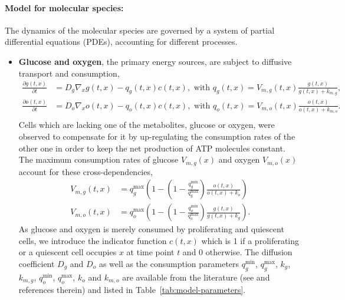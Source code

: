 \documentclass[10pt,letterpaper]{article}
\begin{document}
\paragraph{Model for molecular species:} 
The dynamics of the molecular species are governed by a system of partial differential equations (PDEs), accounting for different processes.
\begin{itemize}
%
\item \textbf{Glucose and oxygen}, the primary energy sources, are subject to diffusive transport and consumption,
\begin{equation*}
\begin{aligned}
	\frac{\partial g(t,x)}{\partial t} &= D_g \nabla_x g(t,x) - q_g(t,x) c(t,x), \text{ with } q_g(t,x) = V_{m,g}(t,x) \frac{g(t,x)}{g(t,x)+k_{m,g}},\\
	\frac{\partial o(t,x)}{\partial t} &= D_o \nabla_x o(t,x) - q_o(t,x) c(t,x), \text{ with } q_o(t,x) = V_{m,o}(t,x) \frac{o(t,x)}{o(t,x)+k_{m,o}}.\\
\end{aligned}
\end{equation*}
Cells which are lacking one of the metabolites, glucose or oxygen, were observed to compensate for it by up-regulating the consumption rates of the other one in order to keep the net production of ATP molecules constant. The maximum consumption rates of glucose $V_{m,g}(x)$ and oxygen $V_{m,o}(x)$ account for these cross-dependencies,
\begin{equation*}
\begin{aligned}
V_{m,g}(t,x) &= q_g^{\max} \left(1 - \left(1- \frac{q_g^{\min}}{q_g^{\max}} \right) \frac{o(t,x)}{o(t,x) + k_o} \right) \\
V_{m,o}(t,x) &= q_o^{\max} \left(1 - \left(1- \frac{q_o^{\min}}{q_o^{\max}} \right) \frac{g(t,x)}{g(t,x) + k_g} \right).
\end{aligned}
\end{equation*}
As glucose and oxygen is merely consumed by proliferating and quiescent cells, we introduce the indicator function $c(t,x)$ which is 1 if a proliferating or a quiescent cell occupies $x$ at time point $t$ and 0 otherwise. The diffusion coefficient $D_g$ and $D_o$ as well as the consumption parameters $q_g^{\min}$, $q_g^{\max}$, $k_g$, $k_{m,g}$, $q_o^{\min}$, $q_o^{\max}$, $k_o$ and $k_{m,o}$ are available from the literature (see \cite{Jagiella2012} and references therein) and listed in Table~\ref{tab:model-parameters}.


\end{itemize}
\end{document}

